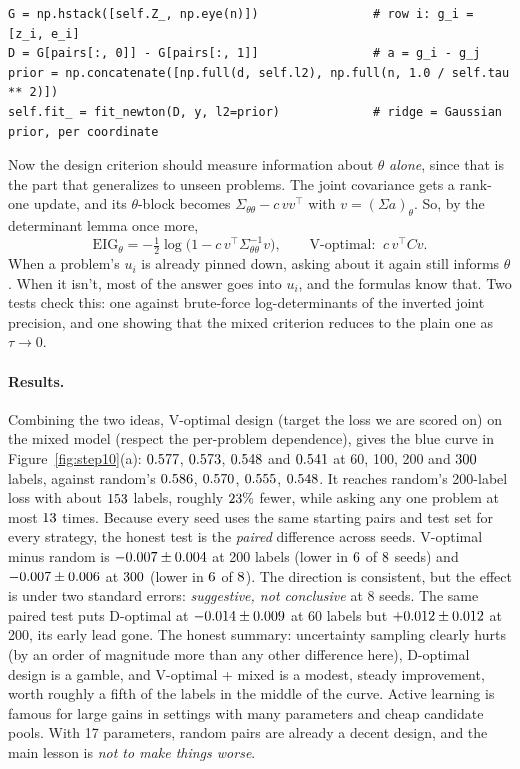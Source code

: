 \documentclass[11pt]{article}
\theoremstyle{definition}
\theoremstyle{plain}
\theoremstyle{remark}
\renewcommand{\_}{\oldunderscore\allowbreak}
\newcommand{\file}[1]{\textcolor{blue!50!black}{\texttt{#1}}}
\newcommand{\codefrom}[1]{\par\smallskip\noindent{\footnotesize\textbf{From} \file{#1}}}
\begin{document}
\codefrom{src/calcdiff/models/mixed\_bt.py}
\begin{lstlisting}
G = np.hstack([self.Z_, np.eye(n)])                # row i: g_i = [z_i, e_i]
D = G[pairs[:, 0]] - G[pairs[:, 1]]                # a = g_i - g_j
prior = np.concatenate([np.full(d, self.l2), np.full(n, 1.0 / self.tau ** 2)])
self.fit_ = fit_newton(D, y, l2=prior)             # ridge = Gaussian prior, per coordinate
\end{lstlisting}
Now the design criterion should measure information about $\theta$ \emph{alone}, since that is the part that generalizes to unseen problems. The joint
covariance gets a rank-one update, and its $\theta$-block becomes $\Sigma_{\theta\theta}-c\,vv^\top$ with $v=(\Sigma a)_\theta$. So, by the determinant lemma once more,
\[
  \mathrm{EIG}_\theta=-\tfrac12\log\bigl(1-c\,v^\top\Sigma_{\theta\theta}^{-1}v\bigr),\qquad
  \text{V-optimal: }\ c\,v^\top Cv .
\]
When a problem's $u_i$ is already pinned down, asking about it again still informs $\theta$. When it isn't, most of the answer goes into $u_i$, and the
formulas know that. Two tests check this: one against brute-force log-determinants of the inverted joint precision, and one showing that the mixed criterion reduces to the plain one as
$\tau\to0$.

\paragraph{Results.}
Combining the two ideas, V-optimal design (target the loss we are scored on) on the mixed model (respect the per-problem dependence), gives the
blue curve in Figure~\ref{fig:step10}(a):
$0.577$, $0.573$, $0.548$ and $0.541$ at 60, 100, 200 and $300$ labels, against random's $0.586$, $0.570$, $0.555$, $0.548$.
It reaches random's 200-label loss with about $153$ labels, roughly $23\%$ fewer, while asking any one problem at most $13$ times.
Because every seed uses the same starting pairs and test set for every strategy, the honest test is the \emph{paired} difference across seeds. V-optimal minus random is
$-0.007\pm0.004$ at 200 labels (lower in $6$ of $8$ seeds) and $-0.007\pm0.006$ at $300$
(lower in $6$ of $8$).
The direction is consistent, but the effect is under two standard errors: \emph{suggestive, not conclusive} at 8 seeds. The same paired test puts
D-optimal at $-0.014\pm0.009$ at 60 labels but $+0.012\pm0.012$ at 200, its early lead gone. The honest summary:
uncertainty sampling clearly hurts (by an order of magnitude more than any other difference here), D-optimal design is a gamble, and V-optimal + mixed is a
modest, steady improvement, worth roughly a fifth of the labels in the middle of the curve. Active learning is famous for large gains in settings with many
parameters and cheap candidate pools. With 17 parameters, random pairs are already a decent design, and the main lesson is \emph{not to make things worse}.
\end{document}
